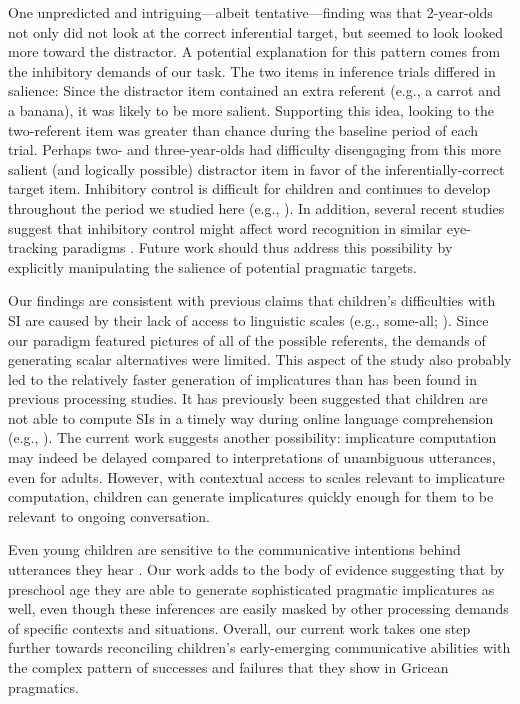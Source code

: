\documentclass[10pt,letterpaper]{article}
\begin{document}
One unpredicted and intriguing---albeit tentative---finding was that 2-year-olds not only did not look at the correct inferential target, but seemed to look looked more toward the distractor. A potential explanation for this pattern comes from the inhibitory demands of our task. The two items in inference trials differed in salience: Since the distractor item contained an extra referent (e.g., a carrot and a banana), it was likely to be more salient. Supporting this idea, looking to the two-referent item was greater than chance during the baseline period of each trial. Perhaps two- and three-year-olds had difficulty disengaging from this more salient (and logically possible) distractor item in favor of the inferentially-correct target item. Inhibitory control is difficult for children and continues to develop throughout the period we studied here (e.g.,  ). In addition, several recent studies suggest that inhibitory control might affect word recognition in similar eye-tracking paradigms \cite{yurovskybeyond,nordmeyer2013measuring}. Future work should thus address this possibility by explicitly manipulating the salience of potential pragmatic targets.

Our findings are consistent with previous claims that children's difficulties with SI are caused by their lack of access to linguistic scales (e.g., some-all; ). Since our paradigm featured pictures of all of the possible referents, the demands of generating scalar alternatives were limited. This aspect of the study also probably led to the relatively faster generation of implicatures than has been found in previous processing studies. It has previously been suggested that children are not able to compute SIs in a timely way during online language comprehension (e.g., ). The current work suggests another possibility: implicature computation may indeed be delayed compared to interpretations of unambiguous utterances, even for adults. However, with contextual access to scales relevant to implicature computation, children can generate implicatures quickly enough for them to be relevant to ongoing conversation. 

Even young children are sensitive to the communicative intentions behind utterances they hear \cite{clark2009first,baldwin1993early}. Our work adds to the body of evidence suggesting that by preschool age they are able to generate sophisticated pragmatic implicatures as well, even though these inferences are easily masked by other processing demands of specific contexts and situations. Overall, our current work takes one step further towards reconciling children's early-emerging communicative abilities with the complex pattern of successes and failures that they show in Gricean pragmatics.
\end{document}
